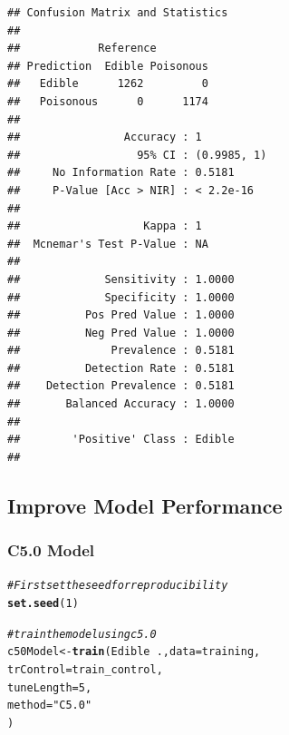 \documentclass[10pt  ,usenames, dvipsnames]{article}\usepackage[]{graphicx}\usepackage[]{color}
\makeatletter
\newcommand{\hlnum}[1]{\textcolor[rgb]{0.686,0.059,0.569}{#1}}%
\newcommand{\hlstr}[1]{\textcolor[rgb]{0.192,0.494,0.8}{#1}}%
\newcommand{\hlcom}[1]{\textcolor[rgb]{0.678,0.584,0.686}{\textit{#1}}}%
\newcommand{\hlopt}[1]{\textcolor[rgb]{0,0,0}{#1}}%
\newcommand{\hlstd}[1]{\textcolor[rgb]{0.345,0.345,0.345}{#1}}%
\newcommand{\hlkwb}[1]{\textcolor[rgb]{0.69,0.353,0.396}{#1}}%
\newcommand{\hlkwc}[1]{\textcolor[rgb]{0.333,0.667,0.333}{#1}}%
\newcommand{\hlkwd}[1]{\textcolor[rgb]{0.737,0.353,0.396}{\textbf{#1}}}%
\newenvironment{kframe}{%
 \def\at@end@of@kframe{}%
 \ifinner\ifhmode%
  \def\at@end@of@kframe{\end{minipage}}%
  \begin{minipage}{\columnwidth}%
 \fi\fi%
 \def\FrameCommand##1{\hskip\@totalleftmargin \hskip-\fboxsep
 \colorbox{shadecolor}{##1}\hskip-\fboxsep
     \hskip-\linewidth \hskip-\@totalleftmargin \hskip\columnwidth}%
 \MakeFramed {\advance\hsize-\width
   \@totalleftmargin\z@ \linewidth\hsize
   \@setminipage}}%
 {\par\unskip\endMakeFramed%
 \at@end@of@kframe}
\newenvironment{knitrout}{}{} %
\makeatother
\begin{document}
\begin{knitrout}
\color{fgcolor}\begin{kframe}
\begin{verbatim}
## Confusion Matrix and Statistics
## 
##            Reference
## Prediction  Edible Poisonous
##   Edible      1262         0
##   Poisonous      0      1174
##                                      
##                Accuracy : 1          
##                  95% CI : (0.9985, 1)
##     No Information Rate : 0.5181     
##     P-Value [Acc > NIR] : < 2.2e-16  
##                                      
##                   Kappa : 1          
##  Mcnemar's Test P-Value : NA         
##                                      
##             Sensitivity : 1.0000     
##             Specificity : 1.0000     
##          Pos Pred Value : 1.0000     
##          Neg Pred Value : 1.0000     
##              Prevalence : 0.5181     
##          Detection Rate : 0.5181     
##    Detection Prevalence : 0.5181     
##       Balanced Accuracy : 1.0000     
##                                      
##        'Positive' Class : Edible     
## 
\end{verbatim}
\end{kframe}
\end{knitrout}




\clearpage


\subsection{Improve Model Performance}

\subsubsection{C5.0 Model}

\begin{knitrout}
\color{fgcolor}\begin{kframe}
\begin{alltt}
\hlcom{#First set the seed for reproducibility}
\hlkwd{set.seed}\hlstd{(}\hlnum{1}\hlstd{)}

\hlcom{#train the model using c5.0}
\hlstd{c50Model}\hlkwb{<-} \hlkwd{train}\hlstd{(Edible}\hlopt{~}\hlstd{.,} \hlkwc{data}\hlstd{=training,}
                 \hlkwc{trControl}\hlstd{=train_control,}
                 \hlkwc{tuneLength}\hlstd{=}\hlnum{5}\hlstd{,}
                 \hlkwc{method}\hlstd{=}\hlstr{"C5.0"}
\hlstd{)}
\end{alltt}
\end{kframe}
\end{knitrout}
\end{document}
